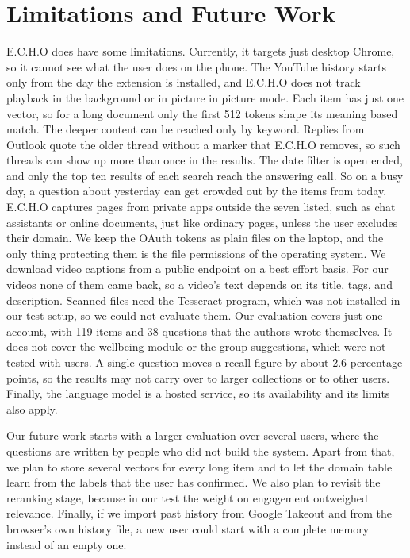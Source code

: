\documentclass[conference]{IEEEtran}
\begin{document}
\section{Limitations and Future Work}\label{sec:limits}
E.C.H.O does have some limitations. Currently, it targets just desktop Chrome, so it cannot see what the user does on the phone. The YouTube history starts only from the day the extension is installed, and E.C.H.O does not track playback in the background or in picture in picture mode. Each item has just one vector, so for a long document only the first 512 tokens shape its meaning based match. The deeper content can be reached only by keyword. Replies from Outlook quote the older thread without a marker that E.C.H.O removes, so such threads can show up more than once in the results. The date filter is open ended, and only the top ten results of each search reach the answering call. So on a busy day, a question about yesterday can get crowded out by the items from today. E.C.H.O captures pages from private apps outside the seven listed, such as chat assistants or online documents, just like ordinary pages, unless the user excludes their domain. We keep the OAuth tokens as plain files on the laptop, and the only thing protecting them is the file permissions of the operating system. We download video captions from a public endpoint on a best effort basis. For our videos none of them came back, so a video's text depends on its title, tags, and description. Scanned files need the Tesseract program, which was not installed in our test setup, so we could not evaluate them. Our evaluation covers just one account, with 119 items and 38 questions that the authors wrote themselves. It does not cover the wellbeing module or the group suggestions, which were not tested with users. A single question moves a recall figure by about 2.6 percentage points, so the results may not carry over to larger collections or to other users. Finally, the language model is a hosted service, so its availability and its limits also apply.

Our future work starts with a larger evaluation over several users, where the questions are written by people who did not build the system. Apart from that, we plan to store several vectors for every long item and to let the domain table learn from the labels that the user has confirmed. We also plan to revisit the reranking stage, because in our test the weight on engagement outweighed relevance. Finally, if we import past history from Google Takeout and from the browser's own history file, a new user could start with a complete memory instead of an empty one.
\end{document}
